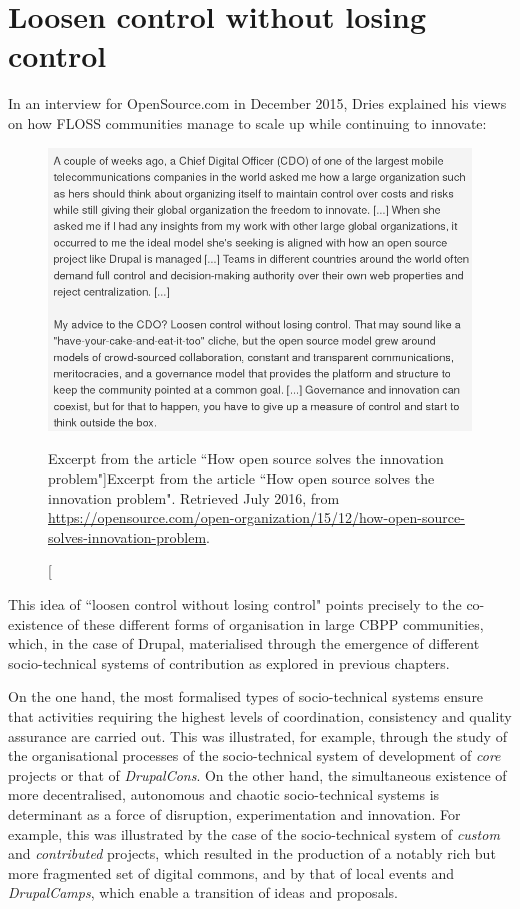 \chapter{Loosen control without losing control}
\label{multilevel:chapter}

In an interview for OpenSource.com in December 2015, Dries \parencite{losen-control:2016:Online} explained his views on how FLOSS communities manage to scale up while continuing to innovate:

\begin{figure}[H]
  \centering
\includegraphics[width=\textwidth]{img/quotes_replacement/loosen_without_losing_controlS2.png}
\caption[Excerpt from the article ``How open source solves the innovation problem"]{Excerpt from the article ``How open source solves the innovation problem". Retrieved  July 2016, from \url{https://opensource.com/open-organization/15/12/how-open-source-solves-innovation-problem}.}
\label{loosen_without_losing_control}
\end{figure}

This idea of ``loosen control without losing control" points precisely to the co-existence of these different forms of organisation in large CBPP communities, which, in the case of Drupal, materialised through the emergence of different socio-technical systems of contribution as explored in previous chapters.

On the one hand, the most formalised types of socio-technical systems ensure that activities requiring the highest levels of coordination, consistency and quality assurance are carried out. This was illustrated, for example, through the study of the organisational processes of the socio-technical system of development of \textit{core} projects or that of \textit{DrupalCons}. On the other hand, the simultaneous existence of more decentralised, autonomous and chaotic socio-technical systems is determinant as a force of disruption, experimentation and innovation. For example, this was illustrated by the case of the socio-technical system of \textit{custom} and \textit{contributed} projects, which resulted in the production of a notably rich but more fragmented set of digital commons, and
by that of local events and \textit{DrupalCamps}, which enable a transition of ideas and proposals.

